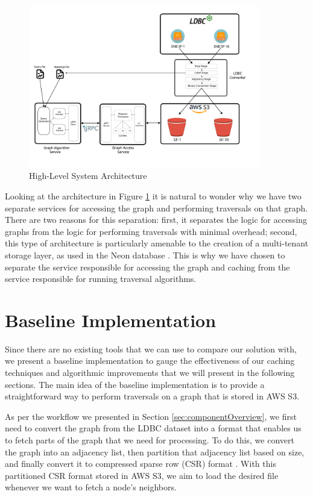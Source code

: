\begin{figure}[ht]
    \centering
    \includegraphics[width=0.9\textwidth]{figures/architecture.png}
    \caption{High-Level System Architecture}
    \label{fig:sysArch}
\end{figure}

Looking at the architecture in Figure \ref{fig:sysArch} it is natural to wonder
why we have two separate services for accessing the graph and performing
traversals on that graph. There are two reasons for this separation: first, it
separates the logic for accessing graphs from the logic for performing
traversals with minimal overhead; second, this type of architecture is
particularly amenable to the creation of a multi-tenant storage layer, as used
in the Neon database \cite{neonPostgres}. This is why we have chosen to separate
the service responsible for accessing the graph and caching from the service
responsible for running traversal algorithms.

\section{Baseline Implementation}\label{sec:baseline}
Since there are no existing tools that we can use to compare our solution with,
we present a baseline implementation to gauge the effectiveness of our caching
techniques and algorithmic improvements that we will present in the following
sections. The main idea of the baseline implementation is to provide a
straightforward way to perform traversals on a graph that is stored in AWS S3.

\medskip
As per the workflow we presented in Section \ref{sec:componentOverview}, we
first need to convert the graph from the LDBC dataset into a format that
enables us to fetch parts of the graph that we need for processing. To
do this, we convert the graph into an adjacency list, then partition that
adjacency list based on size, and finally convert it to compressed sparse
row (CSR) format \cite{duff1984computer}. With this partitioned CSR format stored
in AWS S3, we aim to load the desired file whenever we want to fetch a node's
neighbors.

